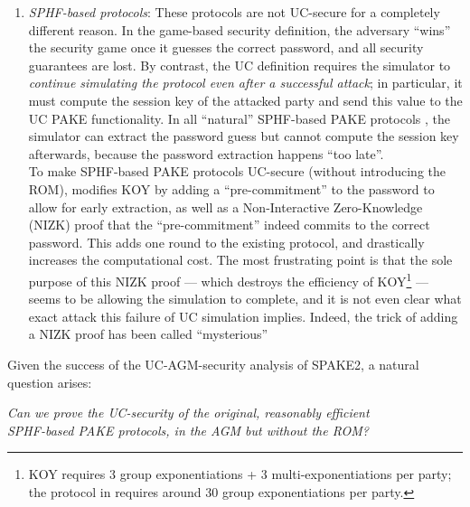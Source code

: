 \begin{enumerate}
  \item \emph{SPHF-based protocols}: These protocols are not UC-secure for a completely different reason. In the game-based security definition, the adversary ``wins'' the security game once it guesses the correct password, and all security guarantees are lost. By contrast, the UC definition requires the simulator to \emph{continue simulating the protocol even after a successful attack}; in particular, it must compute the session key of the attacked party and send this value to the UC PAKE functionality. In all ``natural'' SPHF-based PAKE protocols \cite{EC:KatOstYun01,SAC:JiaGon04,AC:KatVai09a,TCC:KatVai11}, the simulator can extract the password guess but cannot compute the session key afterwards, because the password extraction happens ``too late''. \\
      To make SPHF-based PAKE protocols UC-secure (without introducing the ROM), \cite{EC:CHKLM05} modifies KOY by adding a ``pre-commitment'' to the password to allow for early extraction, as well as a Non-Interactive Zero-Knowledge (NIZK) proof that the ``pre-commitment'' indeed commits to the correct password. This adds one round to the existing protocol, and drastically increases the computational cost. The most frustrating point is that the sole purpose of this NIZK proof --- which destroys the efficiency of KOY\footnote{KOY requires 3 group exponentiations + 3 multi-exponentiations per party; the protocol in \cite{EC:CHKLM05} requires around 30 group exponentiations per party.} --- seems to be allowing the simulation to complete, and it is not even clear what exact attack this failure of UC simulation implies. Indeed, the trick of adding a NIZK proof has been called ``mysterious'' \cite{...}
\end{enumerate}
Given the success of the UC-AGM-security analysis of SPAKE2, a natural question arises:
\begin{displayquote}
\begin{center}
  \emph{Can we prove the UC-security of the original, reasonably efficient \\ SPHF-based PAKE protocols, in the AGM but without the ROM?}
\end{center}
\end{displayquote}

